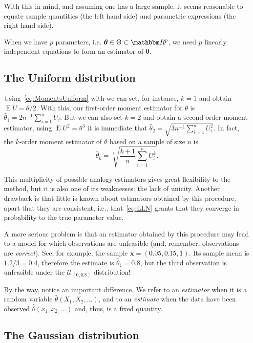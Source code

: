 With this in mind, and assuming one has a large sample, it seems reasonable to equate sample quantities (the left hand side) and parametric expressions (the right hand side).

When we have $p$ parameters, i.e. $\bm \theta\in\Theta\subset\mathbbm R^p$, we need $p$ linearly independent equations to form an estimator of $\bm \theta$.

\subsection{The Uniform distribution}

Using~\eqref{eq:MomentsUniform} with we can set, for instance, $k=1$ and obtain $\operatorname{E}U=\theta/2$.
With this, our first-order moment estimator for $\theta$ is $\widehat{\theta}_1=2n^{-1}\sum_{i=1}^n U_i$.
But we can also set $k=2$ and obtain a second-order moment estimator, using $\operatorname{E}U^2=\theta^3$ it is immediate that
$\widehat{\theta}_2=\sqrt{3n^{-1}\sum_{i=1}^{n} U_i^2}$.
In fact, the $k$-order moment estimator of $\theta$ based on a sample of size $n$ is
\begin{equation}
\widehat{\theta}_k = \sqrt[k]{\frac{k+1}{n} \sum_{i=1}^{n} U_i^k}.
\end{equation}

This multiplicity of possible analogy estimators gives great flexibility to the method, but it is also one of its weaknesses: the lack of unicity.
Another drawback is that little is known about estimators obtained by this procedure, apart that they are consistent, i.e., that~\eqref{eq:LLN} grants that they converge in probability to the true parameter value.

A more serious problem is that an estimator obtained by this procedure may lead to a model for which observations are unfeasible (and, remember, observations are \emph{correct}).
See, for example, the sample $\bm x=(0.05, 0.15, 1)$.
Its sample mean is $1.2/3=0.4$, therefore the estimate is $\widehat{\theta}_1=0.8$, but the third observation is unfeasible under the $\mathcal U_{(0,0.8)}$ distribution!

By the way, notice an important difference.
We refer to an \emph{estimator} when it is a random variable $\widehat{\theta}(X_1, X_2, \dots)$, and to an \emph{estimate} when the data have been observed $\widehat{\theta}(x_1, x_2, \dots)$ and, thus, is a fixed quantity.

\subsection{The Gaussian distribution}

